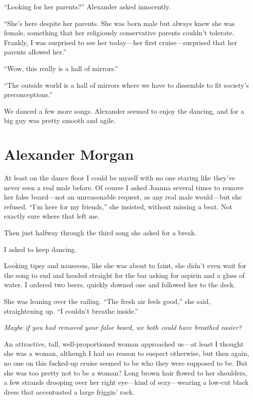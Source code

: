 ``Looking for her parents?'' Alexander asked innocently.

``She's here despite her parents. She was born male but always knew she
was female, something that her religiously conservative parents couldn't
tolerate. Frankly, I was surprised to see her today---her first
cruise---surprised that her parents allowed her.''

``Wow, this really is a hall of mirrors.''

``The outside world is a hall of mirrors where we have to dissemble to
fit society's preconceptions.''

We danced a few more songs. Alexander seemed to enjoy the dancing, and
for a big guy was pretty smooth and agile.

\chapter{Alexander Morgan}

\titlemark

At least on the dance floor I could be myself with no one staring like
they've never seen a real male before. Of course I asked Joanna several
times to remove her false beard---not an unreasonable request, as any
real male would---but she refused. ``I'm here for my friends,'' she
insisted, without missing a beat. Not exactly sure where that left me.

Then just halfway through the third song she asked for a break.

I asked to keep dancing.

Looking tipsy and nauseous, like she was about to faint, she didn't even
wait for the song to end and headed straight for the bar asking for
aspirin and a glass of water. I ordered two beers, quickly downed one
and followed her to the deck.

She was leaning over the railing. ``The fresh air feels good,'' she
said, straightening up. ``I couldn't breathe inside.''

\emph{Maybe if you had removed your false beard, we both could have
breathed easier?}

An attractive, tall, well-proportioned woman approached us---at least I
thought she was a woman, although I had no reason to suspect otherwise,
but then again, no one on this fucked-up cruise seemed to be who they
were supposed to be. But she was too pretty not to be a woman? Long
brown hair flowed to her shoulders, a few strands drooping over her
right eye---kind of sexy---wearing a low-cut black dress that
accentuated a large friggin' rack.

